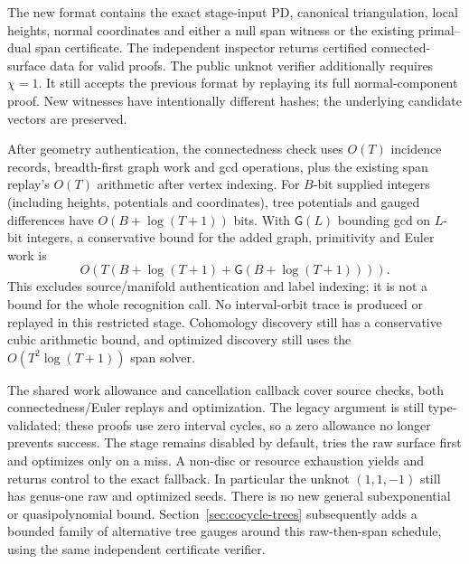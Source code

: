 The new  format contains the exact stage-input
PD, canonical triangulation, local heights, normal coordinates and either
a null span witness or the existing primal--dual span certificate. The
independent inspector returns certified connected-surface data for valid
proofs. The public unknot verifier additionally requires $\chi=1$.
It still accepts the previous  format by
replaying its full normal-component proof. New witnesses have intentionally
different hashes; the underlying candidate vectors are preserved.

After geometry authentication, the connectedness check uses $O(T)$
incidence records, breadth-first graph work and gcd operations, plus the
existing span replay's $O(T)$ arithmetic after vertex indexing. For
$B$-bit supplied integers (including heights, potentials and coordinates),
tree potentials and gauged differences have
$O(B+\log(T+1))$ bits. With $\mathsf G(L)$ bounding gcd on $L$-bit
integers, a conservative bound for the added graph, primitivity and Euler
work is
\[
 O\!\left(T\left(B+\log(T+1)+
                   \mathsf G(B+\log(T+1))\right)\right).
\]
This excludes source/manifold authentication and label indexing; it is not
a bound for the whole recognition call. No interval-orbit trace is produced
or replayed in this restricted stage. Cohomology discovery still has a
conservative cubic arithmetic bound, and optimized discovery still uses
the $O(T^2\log(T+1))$ span solver.

The shared work allowance and cancellation callback cover source checks,
both connectedness/Euler replays and optimization. The legacy
 argument is still type-validated; these proofs use
zero interval cycles, so a zero allowance no longer prevents success.
The stage remains disabled by default, tries the raw surface first and
optimizes only on a miss. A non-disc or resource exhaustion yields
 and returns control to the exact fallback. In
particular the unknot $(1,1,-1)$ still has genus-one raw and optimized
seeds. There is no new general subexponential or quasipolynomial bound.
Section~\ref{sec:cocycle-trees} subsequently adds a bounded family of
alternative tree gauges around this raw-then-span schedule, using the
same independent certificate verifier.


